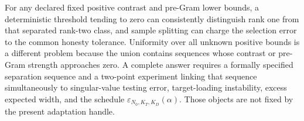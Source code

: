 For any declared fixed positive contrast and pre-Gram lower bounds, a deterministic threshold tending to zero can consistently distinguish rank one from that separated rank-two class, and sample splitting can charge the selection error to the common honesty tolerance.  Uniformity over all unknown positive bounds is a different problem because the union contains sequences whose contrast or pre-Gram strength approaches zero.  A complete answer requires a formally specified separation sequence and a two-point experiment linking that sequence simultaneously to singular-value testing error, target-loading instability, excess expected width, and the schedule \(\varepsilon_{N_0,K_T,K_D}(\alpha)\).  Those objects are not fixed by the present adaptation handle.